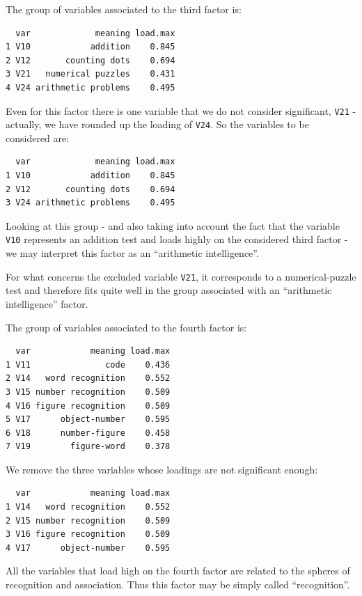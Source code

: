 \documentclass[
  letterpaper,
  DIV=11,
  numbers=noendperiod]{scrartcl}
\begin{document}
The group of variables associated to the third factor is:

\begin{verbatim}
  var             meaning load.max
1 V10            addition    0.845
2 V12       counting dots    0.694
3 V21   numerical puzzles    0.431
4 V24 arithmetic problems    0.495
\end{verbatim}

Even for this factor there is one variable that we do not consider
significant, \texttt{V21} - actually, we have rounded up the loading of
\texttt{V24}. So the variables to be considered are:

\begin{verbatim}
  var             meaning load.max
1 V10            addition    0.845
2 V12       counting dots    0.694
3 V24 arithmetic problems    0.495
\end{verbatim}

Looking at this group - and also taking into account the fact that the
variable \texttt{V10} represents an addition test and loads highly on
the considered third factor - we may interpret this factor as an
``arithmetic intelligence''.

For what concerns the excluded variable \texttt{V21}, it corresponds to
a numerical-puzzle test and therefore fits quite well in the group
associated with an ``arithmetic intelligence'' factor.

The group of variables associated to the fourth factor is:

\begin{verbatim}
  var            meaning load.max
1 V11               code    0.436
2 V14   word recognition    0.552
3 V15 number recognition    0.509
4 V16 figure recognition    0.509
5 V17      object-number    0.595
6 V18      number-figure    0.458
7 V19        figure-word    0.378
\end{verbatim}

We remove the three variables whose loadings are not significant enough:

\begin{verbatim}
  var            meaning load.max
1 V14   word recognition    0.552
2 V15 number recognition    0.509
3 V16 figure recognition    0.509
4 V17      object-number    0.595
\end{verbatim}

All the variables that load high on the fourth factor are related to the
spheres of recognition and association. Thus this factor may be simply
called ``recognition''.
\end{document}
